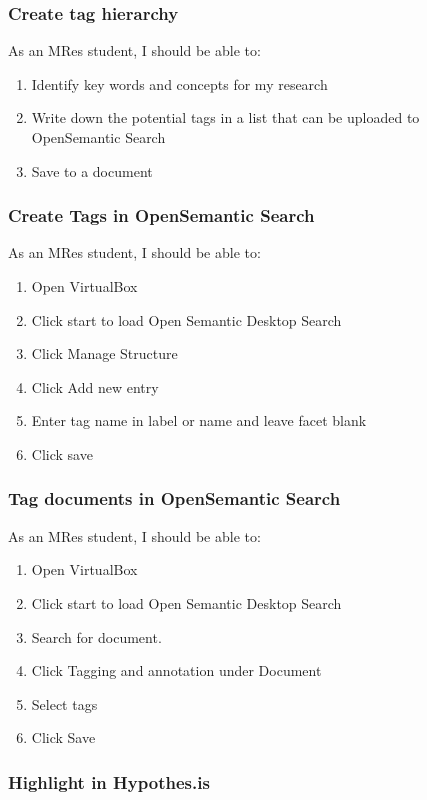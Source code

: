 \documentclass{article}
\begin{document}
\subsubsection*{Create tag hierarchy}

As an MRes student, I should be able to:
\begin{enumerate}
\item Identify key words and concepts for my research
\item Write down the potential tags in a list that can be uploaded to OpenSemantic Search
\item Save to a document
\end{enumerate}

\subsubsection*{Create Tags in OpenSemantic Search}

As an MRes student, I should be able to:
\begin{enumerate}
\item Open VirtualBox
\item Click start to load Open Semantic Desktop Search
\item Click Manage Structure
\item Click Add new entry
\item Enter tag name in label or name and leave facet blank
\item Click save
\end{enumerate}

\subsubsection*{Tag documents in OpenSemantic Search}

As an MRes student, I should be able to:
\begin{enumerate}
\item Open VirtualBox
\item Click start to load Open Semantic Desktop Search
\item Search for document.
\item Click Tagging and annotation under Document
\item Select tags
\item Click Save
\end{enumerate}

\subsubsection*{Highlight in Hypothes.is}
\end{document}
